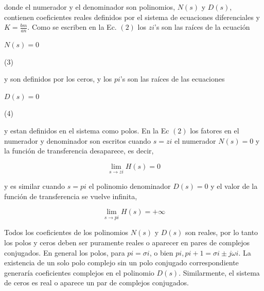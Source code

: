 \documentclass[10pt,a4paper]{article}
\begin{document}
donde el numerador y el denominador son polinomios, $N(s)$ y $D(s)$, contienen coeficientes reales definidos por el sistema de ecuaciones diferenciales y $K=\frac{b{\scriptscriptstyle m}}{a{\scriptscriptstyle n}}$. Como se escriben en la Ec. $(2)$ los $z{\scriptscriptstyle i}$'s son las raíces de la ecuación
\begin{center}
  \begin{center}
    $N(s)=0$
  \end{center}
  \begin{minipage}{0.9\textwidth}
    \begin{flushright}
        (3)
    \end{flushright}
  \end{minipage}
\end{center}
y son definidos por los ceros, y los $p{\scriptscriptstyle i}$'s son las raíces de las ecuaciones
\begin{center}
  \begin{center}
    $D(s)=0$
  \end{center}
  \begin{minipage}{0.9\textwidth}
    \begin{flushright}
        (4)
    \end{flushright}
  \end{minipage}
\end{center}
y estan definidos en el sistema como polos. En la Ec $(2)$ los fatores en el numerador y denominador son escritos cuando $s=z{\scriptscriptstyle i}$ el numerador $N(s) = 0$ y la función de transferencia desaparece, es decir,
\begin{center}
  \[\lim_{s \to z{\scriptscriptstyle i}}H(s) = 0\]
\end{center}
y es similar cuando $s=p{\scriptscriptstyle i}$ el polinomio denominador $D(s)=0$ y el valor de la función de transferencia se vuelve infinita,
\begin{center}
  \[\lim_{s \to p{\scriptscriptstyle i}}H(s) = +\infty\]
\end{center}
Todos los coeficientes de los polinomios $N(s)$ y $D(s)$ son reales, por lo tanto los polos y ceros deben ser puramente reales o aparecer en pares de complejos conjugados. En general los polos, para $p{\scriptscriptstyle i}= \sigma{\scriptscriptstyle i}$, o bien $p{\scriptscriptstyle i},p{\scriptscriptstyle i+1}=\sigma{\scriptscriptstyle i} \pm j\omega{\scriptscriptstyle i}$. La existencia de un solo polo complejo sin un polo conjugado correspondiente generaría coeficientes complejos en el polinomio $D(s)$. Similarmente, el sistema de ceros es real o aparece un par de complejos conjugados.
\end{document}
